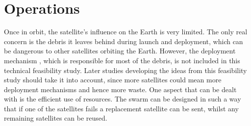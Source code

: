 \section{Operations}
\label{SSOPE}

Once in orbit, the satellite's influence on the Earth is very limited. The only real concern is the debris it leaves behind during launch and deployment, which can be dangerous to other satellites orbiting the Earth.
However, the deployment mechanism , which is responsible for most of the debris, is not included in this technical feasibility study. Later studies developing the ideas from this feasibility study should take it into account, since more satellites could mean more deployment mechanisms and hence more waste.
One aspect that can be dealt with is the efficient use of resources. The swarm can be designed in such a way that if one of the satellites fails a replacement satellite can be sent, whilst any remaining satellites can be reused.